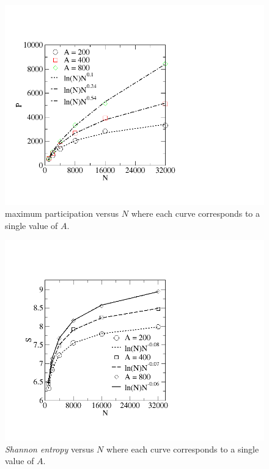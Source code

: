 \documentclass{comjnl}
\begin{document}
\begin{figure}[ht]
  \centering
  \includegraphics[width= \linewidth]{PN.png}
  \caption{maximum participation versus $N$ where each curve corresponds to a single value of $A$.}
\end{figure}

\begin{figure}[ht]
  \centering
  \includegraphics[width= \linewidth]{entropy.png}
  \caption{\textit{Shannon entropy} versus $N$ where each curve corresponds to a single value of $A$.}
\end{figure}
\end{document}
